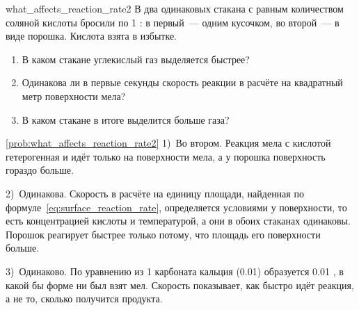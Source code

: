 \begin{problem}{}{what_affects_reaction_rate2}
    В два одинаковых стакана с равным количеством соляной кислоты бросили по \qty{1}{\ruG} : в первый~--- одним кусочком, во второй~--- в виде порошка. Кислота взята в избытке.
    \begin{enumerate}[label=\arabic*)]
        \item В каком стакане углекислый газ выделяется быстрее?
        \item Одинакова ли в первые секунды скорость реакции в расчёте на квадратный метр поверхности мела?
        \item В каком стакане в итоге выделится больше газа?
    \end{enumerate}
    \begin{sol}{\ref{prob:what_affects_reaction_rate2}}
        1)~Во втором. Реакция мела с кислотой гетерогенная и идёт только на поверхности мела, а у порошка поверхность гораздо больше.

        2)~Одинакова. Скорость в расчёте на единицу площади, найденная по формуле~\eqref{eq:surface_reaction_rate}, определяется условиями у поверхности, то есть концентрацией кислоты и температурой, а они в обоих стаканах одинаковы. Порошок реагирует быстрее только потому, что площадь его поверхности больше.

        3)~Одинаково. По уравнению  из \qty{1}{\ruG} карбоната кальция (\qty{0,01}{\ruMole}) образуется \qty{0,01}{\ruMole} , в какой бы форме ни был взят мел. Скорость показывает, как быстро идёт реакция, а не то, сколько получится продукта.
    \end{sol}
\end{problem}

